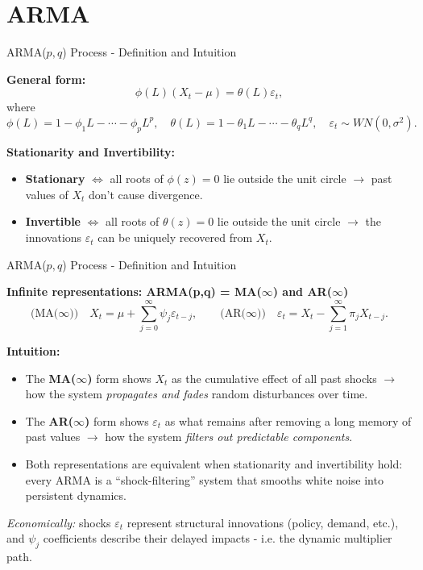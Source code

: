 \documentclass{beamer}
\begin{document}
\section{ARMA}
\begin{frame}{ARMA($p,q$) Process - Definition and Intuition}
\small

\textbf{General form:}
\[
\phi(L)(X_t - \mu) = \theta(L)\varepsilon_t,
\]
where 
\[
\phi(L) = 1 - \phi_1 L - \cdots - \phi_p L^p, 
\quad \theta(L) = 1 - \theta_1 L - \cdots - \theta_q L^q,
\quad \varepsilon_t \sim WN(0,\sigma^2).
\]

\pause
\textbf{Stationarity and Invertibility:}
\begin{itemize}
    \item \textbf{Stationary} $\iff$ all roots of $\phi(z)=0$ lie outside the unit circle  
          $\to$ past values of $X_t$ don’t cause divergence.
    \item \textbf{Invertible} $\iff$ all roots of $\theta(z)=0$ lie outside the unit circle  
          $\to$ the innovations $\varepsilon_t$ can be uniquely recovered from $X_t$.
\end{itemize}
\end{frame}

\begin{frame}{ARMA($p,q$) Process - Definition and Intuition}
\small

\textbf{Infinite representations: ARMA(p,q) = MA($\infty$) and AR($\infty$)}
\[
\text{(MA($\infty$))} \quad X_t = \mu + \sum_{j=0}^{\infty} \psi_j \varepsilon_{t-j},
\qquad
\text{(AR($\infty$))} \quad \varepsilon_t = X_t - \sum_{j=1}^{\infty} \pi_j X_{t-j}.
\]

\textbf{Intuition:}
\begin{itemize}
    \item The \textbf{MA($\infty$)} form shows $X_t$ as the cumulative effect of all past shocks  
          $\to$ how the system \emph{propagates and fades} random disturbances over time.
    \item The \textbf{AR($\infty$)} form shows $\varepsilon_t$ as what remains after removing a long memory of past values  
          $\to$ how the system \emph{filters out predictable components}.
    \item Both representations are equivalent when stationarity and invertibility hold:  
          every ARMA is a “shock-filtering” system that smooths white noise into persistent dynamics.
\end{itemize}

\textit{Economically:} shocks $\varepsilon_t$ represent structural innovations (policy, demand, etc.),  
and $\psi_j$ coefficients describe their delayed impacts - i.e. the dynamic multiplier path.

\end{frame}
\end{document}
